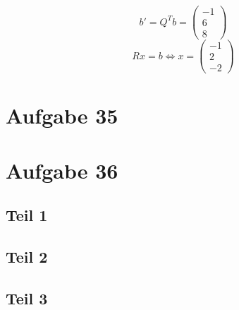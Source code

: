 \documentclass[10pt,a4paper]{article}
\begin{document}
\begin{equation}
  b' = Q^{T}b = \begin{pmatrix}
    -1\\6\\8
  \end{pmatrix}
\end{equation}
\begin{equation}
  Rx = b \Leftrightarrow x = \begin{pmatrix}
    -1\\2\\-2
  \end{pmatrix}
\end{equation}

\section{Aufgabe 35}

\section{Aufgabe 36}

\subsection{Teil 1}

\subsection{Teil 2}

\subsection{Teil 3}
\end{document}
